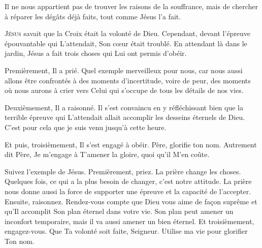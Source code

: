 Il ne nous appartient pas de trouver les raisons de la souffrance,
 mais de chercher à réparer les dégâts déjà faits, tout comme Jésus l'a fait.

\dvrule







\lettrine{J}{ésus} savait que la Croix était la volonté de Dieu.
 Cependant, devant l'épreuve épouvantable qui L'attendait,
 Son c\oe{}ur était troublé. En attendant là dans le jardin,
 Jésus a fait trois choses qui Lui ont permis d'obéir.

Premièrement, Il a prié. Quel exemple merveilleux pour nous,
 car nous aussi allons être confrontés à des moments d'incertitude,
 voire de peur, des moments où nous aurons à crier vers Celui
 qui s'occupe de tous les détails de nos vies.


Deuxièmement, Il a raisonné. Il s'est convaincu en y réfléchissant
 bien que la terrible épreuve qui L'attendait allait accomplir
 les desseins éternels de Dieu.
 \Og C'est pour cela que je suis venu jusqu'à cette heure. \Fg{}

Et puis, troisièmement, Il s'est engagé à obéir.
 \Og Père, glorifie ton nom. \Fg{}
 Autrement dit\frcolon{} 
 \Og Père, Je m'engage à T'amener la gloire, quoi qu'il M'en coûte. \Fg{}

Suivez l'exemple de Jésus. Premièrement, priez.
 La prière change les choses. Quelques fois, 
 ce qui a la plus besoin de changer, c'est notre attitude.
 La prière nous donne aussi la force de supporter une épreuve
 et la capacité de l'accepter. Ensuite, raisonnez. 
 Rendez-vous compte que Dieu vous aime de fa\c{c}on suprême et qu'Il accomplit
 Son plan éternel dans votre vie.
 Son plan peut amener un inconfort temporaire, mais il va aussi amener
 un bien éternel. Et troisièmement, engagez-vous.
 \Og Que Ta volonté soit faite, Seigneur.
 Utilise ma vie pour glorifier Ton nom. \Fg{}

